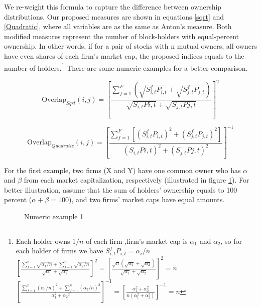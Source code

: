 \begin{appendices}
We re-weight this formula to capture the difference between ownership distributions. Our proposed measures are shown in equations \ref{sqrt} and \ref{Quadratic}, where all variables are as the same as Anton's measure. Both modified measures represent the number of block-holders with equal-percent ownership. In other words, if for a pair of stocks with n mutual owners, all owners have even shares of each firm's market cap, the proposed indices equals to the number of holders.\footnote{Each holder owns $ 1/n $ of each firm ,firm's market cap is $ \alpha_1 $ and $ \alpha_2 $, so for each holder of firms we have $ S^f_{i,t}P_{i,t} = \alpha_i/n $\\
		$
		[  \frac{\sum_{f=1}^{n} \sqrt{\alpha_1/n}+\sum_{f=1}^{n} \sqrt{\alpha_2/n}}{\sqrt{\alpha_1} + \sqrt{\alpha_2}}]^2 
		= [\frac{\sqrt{n}(\sqrt{\alpha_1} +\sqrt{\alpha_2 })}{\sqrt{\alpha_1} + \sqrt{\alpha_2}}]^2 = n $
		\\
		$
		[\frac{\sum_{f=1}^{n} {(\alpha_1/n)^2}+\sum_{f=1}^{n} {(\alpha_2/n)^2}}{\alpha_1^2 +{\alpha_2}^2}]^{-1} = [\frac{{\alpha_1^2 + \alpha_2^2 }}{n(\alpha_1^2 + \alpha_2^2)}]^{-1} = n
		$} There are some numeric examples for a better comparison. 

		\begin{equation}
			\text{Overlap}_{Sqrt}(i, j) =  [\frac{\sum_{f =1}^{F}(\sqrt{S^f_{i,t}P_{i,t}}+\sqrt{S^f_{j,t}P_{j,t}})}{\sqrt{S_{i,t}P{i,t}} + \sqrt{S_{j,t}P{j,t}}}]^2 
			\label{sqrt}
		\end{equation}
		
		\begin{equation}
			\text{Overlap}_{Quadratic}(i, j) =  [{\frac{\sum_{f = 1}^{F}[(S^f_{i,t}P_{i,t})^2+(S^f_{j,t}P_{j,t})^2]}{(S_{i,t}P{i,t})^2 + (S_{j,t}P{j,t})^2}}]^{-1}
			\label{Quadratic}
		\end{equation}


For the first example, two firms (X and Y) have one common owner who has $ \alpha $ and $ \beta $ from each market capitalization, respectively (illustrated in figure \ref{gExample1}).  
For better illustration, assume that the sum of holders' ownership equals to 100 percent ($ \alpha + \beta  = 100$), and two firms' market caps have equal amounts. 
				\begin{figure}[htbp]
					\centering
					\caption{{ Numeric example 1} }
					\label{gExample1}
\end{figure}
\end{appendices}
